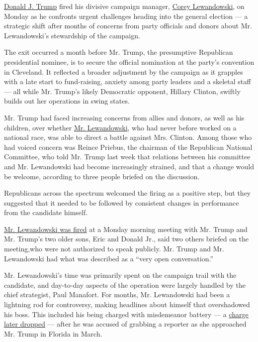 \href{https://www.nytimes.com/2016/06/21/us/politics/donald-trump-money-campaign.html}{Donald
J. Trump} fired his divisive campaign manager,
\href{https://www.nytimes.com/2019/09/17/us/politics/corey-lewandowski-testimony-trump.html}{Corey
Lewandowski}, on Monday as he confronts urgent challenges heading into
the general election --- a strategic shift after months of concerns from
party officials and donors about Mr. Lewandowski's stewardship of the
campaign.

The exit occurred a month before Mr. Trump, the presumptive Republican
presidential nominee, is to secure the official nomination at the
party's convention in Cleveland. It reflected a broader adjustment by
the campaign as it grapples with a late start to fund-raising, anxiety
among party leaders and a skeletal staff --- all while Mr. Trump's
likely Democratic opponent, Hillary Clinton, swiftly builds out her
operations in swing states.

Mr. Trump had faced increasing concerns from allies and donors, as well
as his children, over whether
\href{https://www.nytimes.com/2019/09/17/us/politics/corey-lewandowski-testimony-trump.html}{Mr.
Lewandowski}, who had never before worked on a national race, was able
to direct a battle against Mrs. Clinton. Among those who had voiced
concern was Reince Priebus, the chairman of the Republican National
Committee, who told Mr. Trump last week that relations between his
committee and Mr. Lewandowski had become increasingly strained, and that
a change would be welcome, according to three people briefed on the
discussion.

Republicans across the spectrum welcomed the firing as a positive step,
but they suggested that it needed to be followed by consistent changes
in performance from the candidate himself.

\href{https://www.nytimes.com/2019/09/17/us/politics/corey-lewandowski-testimony-trump.html}{Mr.
Lewandowski was fired} at a Monday morning meeting with Mr. Trump and
Mr. Trump's two older sons, Eric and Donald Jr., said two others briefed
on the meeting,who were not authorized to speak publicly. Mr. Trump and
Mr. Lewandowski had what was described as a ``very open conversation.''

Mr. Lewandowski's time was primarily spent on the campaign trail with
the candidate, and day-to-day aspects of the operation were largely
handled by the chief strategist, Paul Manafort. For months, Mr.
Lewandowski had been a lightning rod for controversy, making headlines
about himself that overshadowed his boss. This included his being
charged with misdemeanor battery --- a
\href{http://www.nytimes.com/2016/04/15/us/politics/corey-lewandowski-trump-campaign-manager.html}{charge
later dropped} --- after he was accused of grabbing a reporter as she
approached Mr. Trump in Florida in March.

